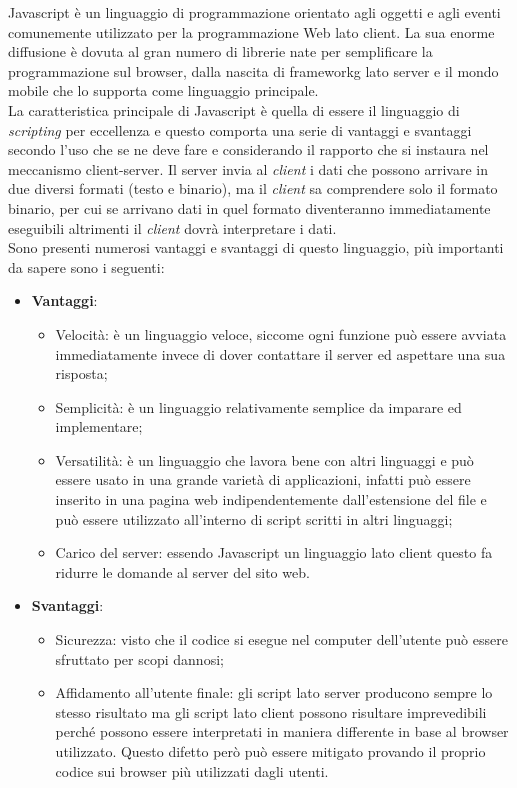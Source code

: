 Javascript è un linguaggio di programmazione orientato agli oggetti e agli eventi comunemente utilizzato per la programmazione Web lato client. La sua enorme diffusione è dovuta al gran numero di librerie nate per semplificare la programmazione sul browser, dalla nascita di \gls{frameworkg} lato server e il mondo mobile che lo supporta come linguaggio principale.\\
La caratteristica principale di Javascript è quella di essere il linguaggio di \textit{scripting} per eccellenza e questo comporta una serie di vantaggi e svantaggi secondo l'uso che se ne deve fare e considerando il rapporto che si instaura nel meccanismo client-server. Il server invia al \textit{client} i dati che possono arrivare in due diversi formati (testo e binario), ma il \textit{client} sa comprendere solo il formato binario, per cui se arrivano dati in quel formato diventeranno immediatamente eseguibili altrimenti il \textit{client} dovrà interpretare i dati.\\
Sono presenti numerosi vantaggi e svantaggi di questo linguaggio, più importanti da sapere sono i seguenti:
\begin{itemize}
	\item \textbf{Vantaggi}:
	\begin{itemize}
		\item Velocità: è un linguaggio veloce, siccome ogni funzione può essere avviata immediatamente invece di dover contattare il server ed aspettare una sua risposta;
		\item Semplicità: è un linguaggio relativamente semplice da imparare ed implementare;
		\item Versatilità: è un linguaggio che lavora bene con altri linguaggi e può essere usato in una grande varietà di applicazioni, infatti può essere inserito in una pagina web indipendentemente dall'estensione del file e può essere utilizzato all'interno di script scritti in altri linguaggi;
		\item Carico del server: essendo Javascript un linguaggio lato client questo fa ridurre le domande al server del sito web.
	\end{itemize}
	\item \textbf{Svantaggi}:
	\begin{itemize}
		\item Sicurezza: visto che il codice si esegue nel computer dell'utente può essere sfruttato per scopi dannosi;
		\item Affidamento all'utente finale: gli script lato server producono sempre lo stesso risultato ma gli script lato client possono risultare imprevedibili perché possono essere interpretati in maniera differente in base al browser utilizzato. Questo difetto però può essere mitigato provando il proprio codice sui browser più utilizzati dagli utenti.
	\end{itemize}
\end{itemize}

